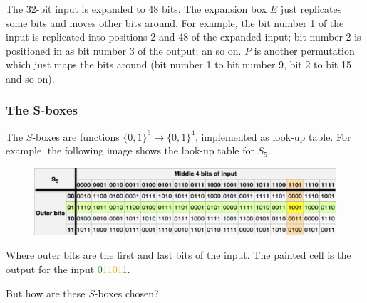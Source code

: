 \documentclass[12pt]{book}
\begin{document}
\begin{center}
\end{center}
The 32-bit input is expanded to 48 bits. The expansion box $E$ just replicates some bits and moves other bits around. For example, the bit number 1 of the input is replicated into positions 2 and 48 of the expanded input; bit number 2 is positioned in as bit number 3 of the output; an so on. $P$ is another permutation which just maps the bits around (bit number 1 to bit number 9, bit 2 to bit 15 and so on).

\subsubsection{The S-boxes}
The $S$-boxes are functions $\{0,1\}^{6}\rightarrow\{0,1\}^{4}$, implemented as look-up table. For example, the following image shows the look-up table for $S_{5}$.
\begin{figure}[H]
	\centering
	\includegraphics[width=\textwidth]{lut}
\end{figure}Where outer bits are the first and last bits of the input. The painted cell is the output for the input \textcolor{green}{0}\textcolor{orange}{1101}\textcolor{green}{1}.

But how are these $S$-boxes chosen?
\end{document}
